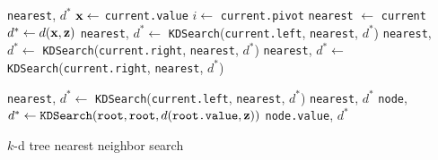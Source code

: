 \begin{algorithm}[h] %
\begin{algorithmic}[1]
    \State {} \texttt{nearest}, $d^*$
\EndIf
\State $\mathbf{x} \gets$ \texttt{current.value}
\State $i \gets$ \texttt{current.pivot}
    \State \texttt{nearest} $\gets$ \texttt{current}
    \State $d^* \gets d(\mathbf{x},\mathbf{z})$
\EndIf
{}
    \State \texttt{nearest}, $d^* \gets$ \texttt{KDSearch}(\texttt{current.left}, \texttt{nearest}, $d^*$)
        \State \texttt{nearest}, $d^* \gets$ \texttt{KDSearch}(\texttt{current.right}, \texttt{nearest}, $d^*$)
    \EndIf
\Else
    \State \texttt{nearest}, $d^* \gets$ \texttt{KDSearch}(\texttt{current.right}, \texttt{nearest}, $d^*$)

        \State \texttt{nearest}, $d^* \gets$ \texttt{KDSearch}(\texttt{current.left}, \texttt{nearest}, $d^*$)
    \EndIf
\EndIf
\State {} \texttt{nearest}, $d^*$
\EndProcedure
\State \texttt{node}, $d^* \gets \texttt{KDSearch}(\texttt{root}, \texttt{root}, d(\texttt{root.value},\mathbf{z}))$
\State {} \texttt{node.value}, $d^*$
\EndProcedure
\end{algorithmic}
\caption{$k$-d tree nearest neighbor search}
\label{alg:nearest-neighbor-search}
\end{algorithm}

